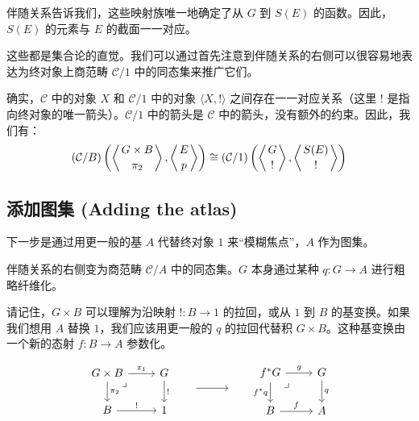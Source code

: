 \documentclass[DaoFP]{subfiles}
\begin{document}
  伴随关系告诉我们，这些映射族唯一地确定了从 $G$ 到 $S(E)$ 的函数。因此，$S(E)$ 的元素与 $E$ 的截面一一对应。

  这些都是集合论的直觉。我们可以通过首先注意到伴随关系的右侧可以很容易地表达为终对象上商范畴 $\mathcal{C}/1$ 中的同态集来推广它们。

  确实，$\mathcal{C}$ 中的对象 $X$ 和 $\mathcal{C}/1$ 中的对象 $\langle X, ! \rangle$ 之间存在一一对应关系（这里 $!$ 是指向终对象的唯一箭头）。$\mathcal{C}/1$ 中的箭头是 $\mathcal{C}$ 中的箭头，没有额外的约束。因此，我们有：
  \[(\mathcal{C}/B) \left( \left \langle {G\times B \atop \pi_2} \right \rangle , \left \langle {E \atop p } \right \rangle \right) \cong (\mathcal{C}/1)  \left( \left \langle {G \atop !} \right \rangle , \left \langle {S(E) \atop ! } \right \rangle \right)  \]

  \subsection{添加图集 (Adding the atlas)}

  下一步是通过用更一般的基 $A$ 代替终对象 $1$ 来“模糊焦点”，$A$ 作为图集。

  伴随关系的右侧变为商范畴 $\mathcal{C}/A$ 中的同态集。$G$ 本身通过某种 $q \colon G \to A$ 进行粗略纤维化。

  请记住，$G \times B$ 可以理解为沿映射 $! \colon B \to 1$ 的拉回，或从 $1$ 到 $B$ 的基变换。如果我们想用 $A$ 替换 $1$，我们应该用更一般的 $q$ 的拉回代替积 $G \times B$。这种基变换由一个新的态射 $f \colon B \to A$ 参数化。

  \[
   \begin{tikzcd}
    G \times B
    \arrow[dr, phantom,  , very near start, "\lrcorner"]
    \arrow[d, "\pi_2"]
    \arrow[r, "\pi_1"]
    & G
    \arrow[d, "!"]
    \\
    B
    \arrow[r, "!"]
    &
    1
   \end{tikzcd}
   \hspace{20pt}
   \begin{tikzpicture}
    \draw[->] (0, 0) -- (1, 0);
   \end{tikzpicture}
   \hspace{20pt}
   \begin{tikzcd}
    f^* G
    \arrow[dr, phantom,  , very near start, "\lrcorner"]
    \arrow[d, "f^*q"']
    \arrow[r, "g"]
    & G
    \arrow[d, "q"]
    \\
    B
    \arrow[r, "f"]
    &A
   \end{tikzcd}
  \]
\end{document}
